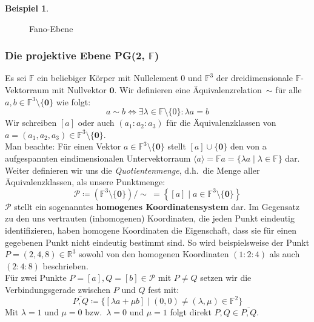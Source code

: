 \documentclass[hidelinks]{article}
\theoremstyle{plain}
\theoremstyle{definition}
\newtheorem{bsp}[thm]{Beispiel}
\theoremstyle{rem}
\newcommand{\pgtwo}{PG(2, $\mathbb{F}$)\ }
\newcommand{\fnz}{\mathbb{F}\setminus\{0\}}
\newcommand{\ftnz}{\mathbb{F}^{3}\setminus\{\boldsymbol 0\}}
\begin{document}
\begin{sloppypar}
\begin{bsp}
\begin{figure}[H]
\caption{Fano-Ebene}
\end{figure}
\end{bsp}


\subsubsection{Die projektive Ebene \pgtwo}
Es sei $\mathbb{F}$ ein beliebiger Körper mit Nullelement $0$ und $\mathbb{F}^3$ der dreidimensionale $\mathbb{F}$-Vektorraum mit Nullvektor $\boldsymbol 0$. Wir definieren eine Äquivalenzrelation~$\sim$ für alle $a,b\in\ftnz$ wie folgt:\\
\begin{equation*}
	a\sim b \Leftrightarrow \exists\lambda\in\fnz:\lambda a=b
\end{equation*}
Wir schreiben $[a]$ oder auch $(a_1:a_2:a_3)$ für die Äquivalenzklassen von $a=(a_1,a_2,a_3)\in\ftnz$.\\
Man beachte: Für einen Vektor $a\in\ftnz$ stellt $[a]\cup\{\boldsymbol 0\}$ den von a aufgespannten eindimensionalen Untervektorraum $\langle a \rangle=\mathbb{F}a=\{\lambda a\mid\lambda\in\mathbb{F}\}$ dar.\\

Weiter definieren wir uns die \textit{Quotientenmenge}, d.h.\ die Menge aller Äquivalenzklassen, als unsere Punktmenge:
\begin{equation*}
	\mathcal{P}\coloneqq(\ftnz)/\sim\ = \left \{[a]\mid a\in\ftnz\right \}
\end{equation*}
$\mathcal{P}$ stellt ein sogenanntes \textbf{homogenes Koordinatensystem} dar. Im Gegensatz zu den uns vertrauten (inhomogenen) Koordinaten, die jeden Punkt eindeutig identifizieren, haben homogene Koordinaten die Eigenschaft, dass sie für einen gegebenen Punkt nicht eindeutig bestimmt sind. So wird beispielsweise der Punkt $P=(2,4,8)\in\mathbb{R}^3$ sowohl von den homogenen Koordinaten $(1:2:4)$ als auch $(2:4:8)$ beschrieben.\\

Für zwei Punkte $P=[a],Q=[b]\in\mathcal{P}$ mit $P\ne Q$ setzen wir die Verbindungsgerade zwischen $P$ und $Q$ fest mit:
\begin{equation*}
	\overline{P,Q}\coloneqq\bigl \{[\lambda a+\mu b]\mid (0,0)\ne(\lambda,\mu)\in\mathbb{F}^2\bigr \}
\end{equation*}
Mit $\lambda=1$ und $\mu=0$ bzw.\ $\lambda=0$ und $\mu=1$ folgt direkt $P,Q\in\overline{P,Q}$.\\


\end{sloppypar}
\end{document}
